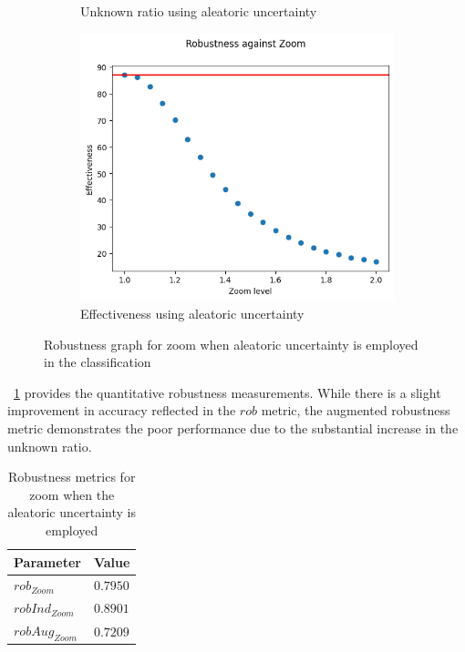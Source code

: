 \begin{figure}[h]
\begin{subfigure}{.33\textwidth}
		\caption{Unknown ratio using aleatoric uncertainty}
		\label{fig:zo_au_unkn}
	\end{subfigure}%
	\begin{subfigure}{.33\textwidth}
		\centering
		\includegraphics[width=0.9\linewidth]{ImageFiles/EvalBNN/ZO/AU/eff}
		\caption{Effectiveness using aleatoric uncertainty}
		\label{fig:zo_au_eff}
	\end{subfigure}
	\caption{Robustness graph for zoom when aleatoric uncertainty is employed in the classification}
	\label{fig:zo_au}
\end{figure}


\Tab~\ref{table:rob_zo_au} provides the quantitative robustness measurements. While there is a slight improvement in accuracy reflected in the $rob$ metric, the augmented robustness metric demonstrates the poor performance due to the substantial increase in the unknown ratio.

\begin{table}[h]
	\centering
	\begin{tabular}{|| l | l ||} 
		\hline
		\textbf{Parameter} & \textbf{Value} \\
		\hline
		\hline
		$rob_{Zoom}$ & $0.7950$ \\
		$robInd_{Zoom}$ & $0.8901$ \\
		$robAug_{Zoom}$ & $0.7209$ \\	
		\hline
	\end{tabular}	
	\caption{Robustness metrics for zoom when the aleatoric uncertainty is employed}
	\label{table:rob_zo_au}
\end{table}

